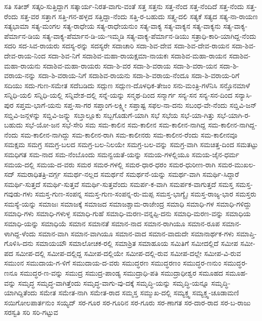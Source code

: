 {ಸತಿ
ಸತೀಶ್
ಸತ್ಕರಿ-ಸುತ್ತಿದ್ದಾಗ
ಸತ್ಕಾರ್ಯ-ನಿರತ-ವಾಗು-ವಂತೆ
ಸತ್ತ
ಸತ್ತನು
ಸತ್ತ-ನೆಂದ
ಸತ್ತ-ನೆಂದಿದೆ
ಸತ್ತ-ನೆಂದು
ಸತ್ತ-ರೆಂದು
ಸತ್ತ-ವರ
ಸತ್ತಾಗ
ಸತ್ತಿ-ಗನ-ಹಳ್ಳದ
ಸತ್ತಿದ್ದಾ-ನೆಂದು
ಸತ್ತಿ-ರ-ಬಹುದು
ಸತ್ತ್ಯ-ದಲಿ
ಸತ್ಯಕೆ
ಸತ್ಯದ
ಸತ್ಯ-ನಾ-ರಾಯಣ
ಸತ್ಯಭಾಮಾ
ಸತ್ಯ-ಮಂಗಲ
ಸತ್ಯ-ರಾಧೇಯ
ಸತ್ಯ-ರಾಧೇಯನುಂ
ಸತ್ಯ-ವಾಕ್ಯ
ಸತ್ಯ-ವಾಕ್ಯನ
ಸತ್ಯ-ವಾಕ್ಯನು
ಸತ್ಯ-ವಾಕ್ಯ-ಪೆರ್ಮಾನ-ಡಿಯ
ಸತ್ಯ-ವಾಕ್ಯ-ಪೆರ್ಮಾನ-ಡಿ-ಯ-ಇಮ್ಮಡಿ
ಸತ್ಯ-ವಾಕ್ಯ-ಪೆರ್ಮಾನ-ಡಿಯು
ಸತ್ರಾಧಿ-ಕಾರಿ-ಯಾಗಿದ್ದ-ನೆಂದು
ಸದರಿ
ಸದ-ಸಿವ-ರಾಯರು
ಸದಸ್ಯ-ರನ್ನು
ಸದಸ್ಯರೇ
ಸದಾಚಾರಿ
ಸದಾ-ಶಿವ-ದೇವ
ಸದಾ-ಶಿವ-ದೇವ-ರಾಯನ
ಸದಾ-ಶಿವ-ದೇವ-ರಾಯ-ನಿಂದ
ಸದಾ-ಶಿವ-ನಿಗೆ
ಸದಾಶಿವ-ಮಹಾ-ರಾಯಕ್ಷಮಾ-ನಾಯಕಃ
ಸದಾಶಿವ-ಮಹಾ-ರಾಯನ
ಸದಾಶಿವ-ಮಹಾ-ರಾಯನು
ಸದಾಶಿವ-ಮಹಾ-ರಾಯರು
ಸದಾ-ಶಿ-ವರ
ಸದಾ-ಶಿ-ವರಾಯ
ಸದಾ-ಶಿ-ವರಾ-ಯನ
ಸದಾ-ಶಿ-ವರಾಯ-ನನ್ನು
ಸದಾ-ಶಿ-ವರಾಯ-ನಿಗೆ
ಸದಾಶಿವ-ರಾಯನು
ಸದಾ-ಶಿ-ವರಾಯ-ನೆಂದೂ
ಸದಾ-ಶಿ-ವರಾಯ-ರಿಗೆ
ಸದಿಯು
ಸದು-ಗುಣ-ಸಮೇತ
ಸದೆಬಡಿದು
ಸದ್ಗುಣ
ಸದ್ಗುಣ-ದೊಳಧಿಕ-ತೇಜಂ
ಸನು-ಮಂತ್ರಿ-ಗಳೆನಿಸಿ
ಸನ್ತೊನಮಾಳೆ
ಸನ್ನಿಧಿ-ಯಲಿ
ಸನ್ನಿಧಿ-ಯಲ್ಲಿ
ಸನ್ನಿವೇಶ-ದಲ್ಲಿ
ಸನ್ನೆ-ಯನ್ನು
ಸನ್ಮಥ-ದಿಂದ
ಸನ್ಮಾರ್ಗ
ಸನ್ಯ-ಸನ
ಸನ್ಯ-ಸನ-ದಿಂದ
ಸನ್ಯಾಸಿ-ಪುರ
ಸಪ್ತಮ-ಭಾಗೆ-ಯನು
ಸಪ್ತ-ಸಾ-ಗರ
ಸಪ್ತಾಂಗ-ಲಕ್ಷ್ಮೀ
ಸಪ್ತಾಷ್ಟ
ಸಫಲ-ನಾ-ದನು
ಸಬಂಧ-ವೇ-ನೆಂದು
ಸಬ್ಡಿವಿ-ಜನ್
ಸಬ್ಡಿವಿ-ಜನ್ಗಳನ್ನು
ಸಬ್ಡಿವಿ-ಜನ್ನ್ನು
ಸಬ್ತಾಲ್ಲೂಕು
ಸಬ್ಬಗೊಡುಗೆ-ಯಾಗಿ
ಸಭೆ
ಸಭೆಯ
ಸಭೆ-ಯಾ-ಗಿತ್ತು
ಸಭೆ-ಯಾಗಿ-ರ-ಬಹುದು
ಸಭೆ-ಯೋ-ಜನ
ಸಭೆ-ಸೇರಿ
ಸಮ
ಸಮ-ಕಾಲಿನ
ಸಮ-ಕಾಲೀನ
ಸಮ-ಕಾಲೀನ-ನಾಗಿದ್ದ
ಸಮ-ಕಾಲೀನ-ನಾಗಿದ್ದ-ನೆಂದು
ಸಮ-ಕಾಲೀನ-ನಾಗಿದ್ದು
ಸಮ-ಕಾಲೀನ-ರಾಗಿ
ಸಮ-ಕಾಲೀನರು
ಸಮ-ಕಾಲೀನ-ರೆಂದು
ಸಮ-ಕಾಲೀನವೂ
ಸಮಕ್ಷಮ
ಸಮಗ್ರ
ಸಮಗ್ರ-ಬಲದ
ಸಮಗ್ರ-ಬಲ-ನಿಲಯೇ
ಸಮಗ್ರ-ಬಲ-ವನ್ನು
ಸಮಗ್ರ-ವಾಗಿ
ಸಮಚಿತ್ತ-ದಿಂದ
ಸಮತಟ್ಟು
ಸಮಧಿಗತ
ಸಮ-ನಾದ
ಸಮ-ನೆಂಬೊಂದು
ಸಮನ್ವಯತೆ-ಯನ್ನು
ಸಮಯ-ಗಳಲ್ಲಿಯೂ
ಸಮಯ-ಜೈನ-ಧರ್ಮ
ಸಮಯ-ದಲ್ಲಿ
ಸಮಯ-ದ-ವರು
ಸಮರ
ಸಮರ-ಗಳಲ್ಲಿ
ಸಮರ-ಧಾರ-ಧರಂ
ಸಮರ-ಧುರೀಣ-ರಾಗಿ
ಸಮರ-ಮುಖಲ-ಸದ್
ಸಮರಾಧಿತತ್ರಿ-ವರ್ಗ್ಗ
ಸಮರ್ಥ-ನಲ್ಲದ
ಸಮರ್ಥನೆ
ಸಮರ್ಥನೆ-ಯನ್ನು
ಸಮರ್ಥ-ವಾಗಿ
ಸಮರ್ಥಿ-ಸಿದ್ದಾರೆ
ಸಮರ್ಥಿ-ಸುತ್ತದೆ
ಸಮರ್ಥಿ-ಸುತ್ತವೆ
ಸಮರ್ಥಿ-ಸುತ್ತವೆಂದು
ಸಮರ್ಪ-ಕ-ವಾಗಿ
ಸಮರ್ಪಕ-ವಾಗುತ್ತದೆ
ಸಮಸ್ತ
ಸಮಸ್ತ-ಗವುಡು-ಗಳು
ಸಮಸ್ತ-ಗುಣ-ಸಂಪನ್ನ
ಸಮಸ್ತ-ಗುಣ-ಸಂಪನ್ನ-ರು-ಮಪ್ಪ
ಸಮಸ್ತ-ಭಾಗ್ಯೈಃ
ಸಮಸ್ತ-ರಾಜ್ಯ-ಭಾರ
ಸಮಸ್ತರು
ಸಮಸ್ಯೆ-ಯನ್ನು
ಸಮಾಜಃ
ಸಮಾಜಕ್ಕೆ
ಸಮಾಜದ
ಸಮಾಜಶ್ಚಾಮ-ರಾಜೇಂದ್ರ
ಸಮಾಧಿ
ಸಮಾಧಿ-ಗಳ
ಸಮಾಧಿ-ಗಳಿದ್ದು
ಸಮಾಧಿ-ಗಳು
ಸಮಾಧಿ-ಗಳುಳ್ಳ
ಸಮಾಧಿ-ಗುಹೆ
ಸಮಾಧಿ-ಮರಣ-ವನ್ನಪ್ಪಿ-ದನು
ಸಮಾಧಿ-ಮರಣ-ವನ್ನು
ಸಮಾಧಿಯ
ಸಮಾಧಿ-ಯನ್ನು
ಸಮಾಧಿಯೆ
ಸಮಾನ
ಸಮಾನತೆ
ಸಮಾನ-ನಾದ
ಸಮಾನ-ರಾಗಿಯೂ
ಸಮಾನ-ರೂಪ
ಸಮಾನ-ಳಾಗಿದ್ದ-ಳೆಂದು
ಸಮಾನ-ವಾಗಿ
ಸಮಾನ-ವಾಗಿಯೂ
ಸಮಾನ-ವಾದ
ಸಮಾನ-ವಾದುದೇ
ಸಮಾನಾರ್ಥಕ-ಗಳು
ಸಮಾಪ್ತಿ-ಗೊಳಿಸಿ-ದನು
ಸಮಾಯಯೌ
ಸಮಾಲೋಚಕ-ರಲ್ಲಿ
ಸಮಾಶ್ರಿತ
ಸಮಾಹೂಯ
ಸಮಿತಿಗೆ
ಸಮೀದಲ್ಲಿದೆ
ಸಮೀಪ
ಸಮೀ-ಪದ
ಸಮೀಪ-ದಲ್ಲಿ
ಸಮೀಪ-ದಲ್ಲಿದ್ದ
ಸಮೀಪ-ದಲ್ಲಿಯೇ
ಸಮೀಪ-ದಲ್ಲಿ-ರುವ
ಸಮೀಪ-ದಲ್ಲೇ
ಸಮೀಪ-ವಿ-ರುವ
ಸಮುಂನ
ಸಮುದಾಯ-ಗ-ಳಿಗೆ
ಸಮುದಾಯ-ದ-ವರು
ಸಮುದ್ಧರಣ
ಸಮುದ್ಧರಣಂ
ಸಮುದ್ಧರ-ಣನುಂ
ಸಮುದ್ಧರ-ಣನೂ
ಸಮುದ್ಧರ-ಣ-ವನ್ನು
ಸಮುದ್ರ
ಸಮುದ್ರ-ಪಾಂಡ್ಯ
ಸಮುದ್ರಾಧಿ-ಪತಿ
ಸಮುದ್ರಾಧೀಶ್ವರ
ಸಮೂಹದ
ಸಮೂಹ-ವನ್ನು
ಸಮೃದ್ಧ
ಸಮೃದ್ಧ-ವಾಗಿತ್ತೆಂದು
ಸಮೃದ್ಧ-ವಾಗು-ವು-ದಕ್ಕೆ
ಸಮೃದ್ಧಿ-ಯನ್ನು
ಸಮೃದ್ಧಿ-ಯನ್ನೂ
ಸಮೃದ್ಧಿ-ಯಾಗಿದ್ದಿತೆಂದು
ಸಮೇತ
ಸಮೇತ-ನಾಗಿ
ಸಮೇತ-ರಾದ
ಸಮ್ಮಸ್ತ
ಸಮ್ಮುಖ-ದಲ್ಲಿ
ಸಮ್ಯಕ್ತ್ವ
ಸಮ್ಯಕ್ತ್ವ-ಚೂಡಾಮಣಿ
ಸಯಿಗೋಲಪಾರ್ತನುಂ
ಸಯ್ಯದ್
ಸರ-ಗೂರ
ಸರ-ಗೂರಿನ
ಸರ-ಗೂರು
ಸರ-ಣಾಗತ
ಸರ-ದಾರ-ರಾದ
ಸರ-ಬ-ರಾಜು
ಸರಸ್ವತಿ
ಸರಿ
ಸರಿ-ಗಟ್ಟುವ
}
